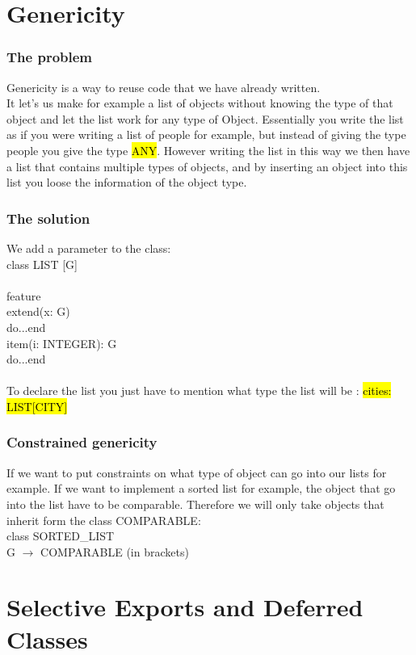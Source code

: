 \documentclass[11pt]{article}
\newcommand\tab[1][1cm]{\hspace*{#1}}
\begin{document}
\section{Genericity}
\subsubsection{The problem}
Genericity is a way to reuse code that we have already written.\\It let's us make for example a list of objects without knowing the type of that object and let the list work for any type of Object. Essentially you write the list as if you were writing a list of people for example, but instead of giving the type people you give the type \hl{ANY}. However writing the list in this way we then have a list that contains multiple types of objects, and by inserting an object into this list you loose the information of the object type.
\subsubsection{The solution}
We add a parameter to the class:\\class LIST [G]\\\\feature\\\tab extend(x: G)\\\tab\tab do...end\\\tab item(i: INTEGER): G\\\tab\tab do...end\\\\To declare the list you just have to mention what type the list will be : \hl{cities: LIST[CITY]}
\subsubsection{Constrained genericity}
If we want to put constraints on what type of object can go into our lists for example. If we want to implement a sorted list for example, the object that go into the list have to be comparable. Therefore we will only take objects that inherit form the class COMPARABLE:\\class SORTED\_LIST\\\tab G $\rightarrow$ COMPARABLE (in brackets)
\section{Selective Exports and Deferred Classes}
\end{document}
